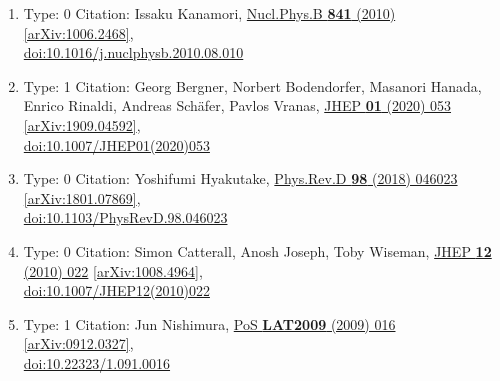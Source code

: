 \documentclass[a4paper,10pt]{article}
\begin{document}
\begin{enumerate}
\begin{enumerate}
  \item Type: 0 Citation: Issaku Kanamori, \href{https://www.doi.org/10.1016/j.nuclphysb.2010.08.010}{Nucl.Phys.B {\bf 841} (2010) }  \href{https://arxiv.org/abs/1006.2468}{[arXiv:1006.2468]},\\\href{https://www.doi.org/10.1016/j.nuclphysb.2010.08.010}{doi:10.1016/j.nuclphysb.2010.08.010}
  \item Type: 1 Citation: Georg Bergner, Norbert Bodendorfer, Masanori Hanada, Enrico Rinaldi, Andreas Schäfer, Pavlos Vranas, \href{https://www.doi.org/10.1007/JHEP01(2020)053}{JHEP {\bf 01} (2020) 053}  \href{https://arxiv.org/abs/1909.04592}{[arXiv:1909.04592]},\\\href{https://www.doi.org/10.1007/JHEP01(2020)053}{doi:10.1007/JHEP01(2020)053}
  \item Type: 0 Citation: Yoshifumi Hyakutake, \href{https://www.doi.org/10.1103/PhysRevD.98.046023}{Phys.Rev.D {\bf 98} (2018) 046023}  \href{https://arxiv.org/abs/1801.07869}{[arXiv:1801.07869]},\\\href{https://www.doi.org/10.1103/PhysRevD.98.046023}{doi:10.1103/PhysRevD.98.046023}
  \item Type: 0 Citation: Simon Catterall, Anosh Joseph, Toby Wiseman, \href{https://www.doi.org/10.1007/JHEP12(2010)022}{JHEP {\bf 12} (2010) 022}  \href{https://arxiv.org/abs/1008.4964}{[arXiv:1008.4964]},\\\href{https://www.doi.org/10.1007/JHEP12(2010)022}{doi:10.1007/JHEP12(2010)022}
  \item Type: 1 Citation: Jun Nishimura, \href{https://www.doi.org/10.22323/1.091.0016}{PoS {\bf LAT2009} (2009) 016}  \href{https://arxiv.org/abs/0912.0327}{[arXiv:0912.0327]},\\\href{https://www.doi.org/10.22323/1.091.0016}{doi:10.22323/1.091.0016}

\end{enumerate}
\end{enumerate}
\end{document}
